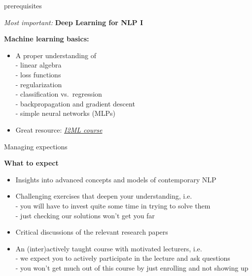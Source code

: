 \documentclass[11pt,compress,t,notes=noshow, xcolor=table]{beamer}
\begin{document}
\begin{frame}{prerequisites}
	
\vfill
	
\textit{Most important:} \textbf{Deep Learning for NLP I}

\vspace{1em}

\textbf{Machine learning basics:}

		\begin{itemize}
				\item A proper understanding of\\
				- linear algebra\\
				- loss functions\\
				- regularization\\
				- classification vs.\ regression\\
				- backpropagation and gradient descent\\
				- simple neural networks (MLPs)
				\item Great resource: \href{https://slds-lmu.github.io/i2ml/}{\textit{I2ML course}}
		\end{itemize}

\vfill

\end{frame}


\begin{frame}{Managing expections}

\vfill

\textbf{What to expect}

	\begin{itemize}
		\item Insights into advanced concepts and models of contemporary NLP
		\item Challenging exercises that deepen your understanding, i.e.\\
		- you will have to invest quite some time in trying to solve them\\
		- just checking our solutions won't get you far
		\item Critical discussions of the relevant research papers
		\item An (inter)actively taught course with motivated lecturers, i.e.\\
		- we expect you to actively participate in the lecture and ask questions\\
		- you won't get much out of this course by just enrolling and not showing up
	\end{itemize}


\vfill

\end{frame}
\end{document}

